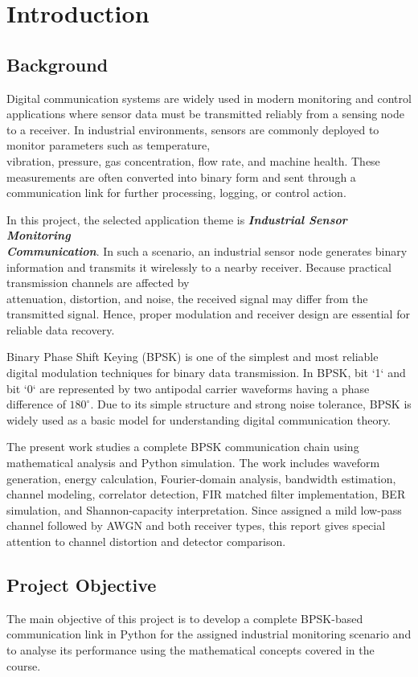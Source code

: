 \chapter{Introduction}

\section{Background}
Digital communication systems are widely used in modern monitoring and control applications 
where sensor data must be transmitted reliably from a sensing node to a receiver. 
In industrial environments, sensors are commonly deployed to monitor parameters 
such as temperature, \\vibration, pressure, gas concentration, flow rate, and machine health. 
These measurements are often converted into binary form and sent through a communication link for further processing, logging, or control action.

In this project, the selected application theme is 
\textbf{\textit{Industrial Sensor Monitoring \\Communication}}. 
In such a scenario, an industrial sensor node generates binary information and transmits it wirelessly to a nearby receiver. 
Because practical transmission channels are affected by \\attenuation, distortion, and noise, the received signal may differ from the transmitted signal. 
Hence, proper modulation and receiver design are essential for reliable data recovery.

Binary Phase Shift Keying (BPSK) is one of the simplest and most reliable digital modulation techniques for binary data transmission. 
In BPSK, bit `1` and bit `0` are represented by two antipodal carrier waveforms having a phase difference of \(180^\circ\). 
Due to its simple structure and strong noise tolerance, 
BPSK is widely used as a basic model for understanding digital communication theory.

The present work studies a complete BPSK communication chain using mathematical analysis and Python simulation. 
The work includes waveform generation, energy calculation, Fourier-domain analysis, bandwidth estimation, channel modeling, correlator detection, FIR matched filter implementation, BER simulation, and Shannon-capacity interpretation. 
Since assigned a mild low-pass channel followed by AWGN and both receiver types, this report gives special attention to channel distortion and detector comparison.

\section{Project Objective}
The main objective of this project is to develop a complete BPSK-based communication link in Python for the assigned industrial monitoring scenario 
and to analyse its performance using the mathematical concepts covered in the course.

